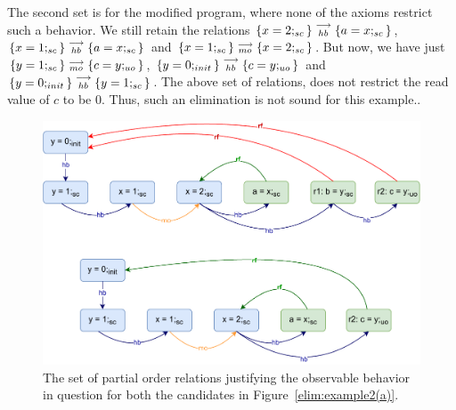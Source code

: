         The second set is for the modified program, where none of the axioms restrict such a behavior. 
        We still retain the relations $\{x=2;_{sc}\}\stackrel{\longrightarrow}{_{hb}}\{a=x;_{sc}\}$, $\{x=1;_{sc}\}\stackrel{\longrightarrow}{_{hb}}\{a=x;_{sc}\}$ and $\{x=1;_{sc}\}\stackrel{\longrightarrow}{_{mo}}\{x=2;_{sc}\}$. 
        But now, we have just $\{y=1;_{sc}\}\stackrel{\longrightarrow}{_{mo}}\{c=y;_{uo}\}$, $\{y=0;_{init}\}\stackrel{\longrightarrow}{_{hb}}\{c=y;_{uo}\}$ and $\{y=0;_{init}\}\stackrel{\longrightarrow}{_{hb}}\{y=1;_{sc}\}$.
        The above set of relations, does not restrict the read value of $c$ to be $0$.
        Thus, such an elimination is not sound for this example\footnotemark..
        \begin{figure}[H]
            \centering
            \includegraphics[scale=0.7]{5.Elimination/EliminationExample2(b).pdf}
            \caption{The set of partial order relations justifying the observable behavior in question for both the candidates in Figure~\ref{elim:example2(a)}.} 
            \label{elim:example2(b)}
        \end{figure}
    
